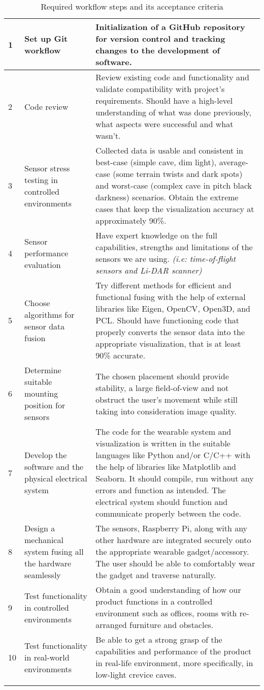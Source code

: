 \documentclass[11pt]{article}
\begin{document}
\begin{longtable}{p{} p{} p{}}
				1 & Set up Git workflow & Initialization of a GitHub repository for version control and tracking changes to the development of software. \\
				\midrule
				2 & Code review & Review existing code and functionality and validate compatibility with project's requirements. Should have a high-level understanding of what was done previously, what aspects were successful and what wasn't. \\
				\midrule
				3 & Sensor stress testing in controlled environments & Collected data is usable and consistent in best-case (simple cave, dim light), average-case (some terrain twists and dark spots) and worst-case (complex cave in pitch black darkness) scenarios. Obtain the extreme cases that keep the visualization accuracy at approximately 90\%. \\
				\midrule
				4 & Sensor performance evaluation & Have expert knowledge on the full capabilities, strengths and limitations of the sensors we are using. \textit{(i.e: time-of-flight sensors and Li-DAR scanner)} \\
				\midrule
				5 & Choose algorithms for sensor data fusion & Try different methods for efficient and functional fusing with the help of external libraries like Eigen, OpenCV, Open3D, and PCL. Should have functioning code that properly converts the sensor data into the appropriate visualization, that is at least 90\% accurate. \\
				\midrule
				6 & Determine suitable mounting position for sensors & The chosen placement should provide stability, a large field-of-view and not obstruct the user's movement while still taking into consideration image quality.\\
				\midrule
				7 & Develop the software and the physical electrical system & The code for the wearable system and visualization is written in the suitable languages like Python and/or C/C++ with the help of libraries like Matplotlib and Seaborn. It should compile, run without any errors and function as intended. The electrical system should function and communicate properly between the code. \\
				\midrule
				8 & Design a mechanical system fusing all the hardware seamlessly & The sensors, Raspberry Pi, along with any other hardware are integrated securely onto the appropriate wearable gadget/accessory. The user should be able to comfortably wear the gadget and traverse naturally. \\
				\midrule
				9 & Test functionality in controlled environments & Obtain a good understanding of how our product functions in a controlled environment such as offices, rooms with re-arranged furniture and obstacles. \\
				\midrule
				10 & Test functionality in real-world environments & Be able to get a strong grasp of the capabilities and performance of the product in real-life environment, more specifically, in low-light crevice caves.\\
				\bottomrule
				\caption{Required workflow steps and its acceptance criteria}
			\end{longtable}
	
\end{document}
